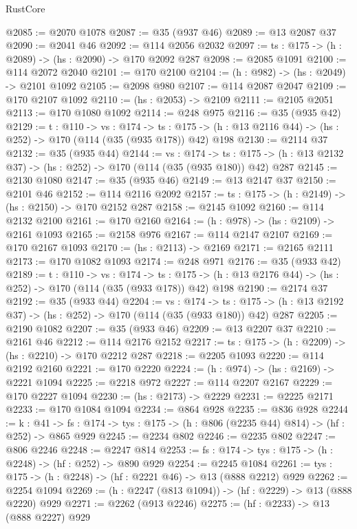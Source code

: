 \begin{lexlean}{RustCore}
\begin{coremodule}
@2085 := @2070 @1078
@2087 := @35 (@937 @46)
@2089 := @13 @2087 @37
@2090 := @2041 @46
@2092 := @114 @2056 @2032
@2097 := {ts : @175} -> (h : @2089) -> (hs : @2090) -> @170 @2092 @287
@2098 := @2085 @1091
@2100 := @114 @2072 @2040
@2101 := @170 @2100
@2104 := (h : @982) -> (hs : @2049) -> @2101 @1092
@2105 := @2098 @980
@2107 := @114 @2087 @2047
@2109 := @170 @2107 @1092
@2110 := (hs : @2053) -> @2109
@2111 := @2105 @2051
@2113 := @170 @1080 @1092
@2114 := @248 @975
@2116 := @35 (@935 @42)
@2129 := {t : @110} ->
  {vs : @174} ->
  {ts : @175} -> (h : @13 @2116 @44) -> (hs : @252) -> @170 (@114 (@35 (@935 @178)) @42) @198
@2130 := @2114 @37
@2132 := @35 (@935 @44)
@2144 := {vs : @174} ->
  {ts : @175} -> (h : @13 @2132 @37) -> (hs : @252) -> @170 (@114 (@35 (@935 @180)) @42) @287
@2145 := @2130 @1080
@2147 := @35 (@935 @46)
@2149 := @13 @2147 @37
@2150 := @2101 @46
@2152 := @114 @2116 @2092
@2157 := {ts : @175} -> (h : @2149) -> (hs : @2150) -> @170 @2152 @287
@2158 := @2145 @1092
@2160 := @114 @2132 @2100
@2161 := @170 @2160
@2164 := (h : @978) -> (hs : @2109) -> @2161 @1093
@2165 := @2158 @976
@2167 := @114 @2147 @2107
@2169 := @170 @2167 @1093
@2170 := (hs : @2113) -> @2169
@2171 := @2165 @2111
@2173 := @170 @1082 @1093
@2174 := @248 @971
@2176 := @35 (@933 @42)
@2189 := {t : @110} ->
  {vs : @174} ->
  {ts : @175} -> (h : @13 @2176 @44) -> (hs : @252) -> @170 (@114 (@35 (@933 @178)) @42) @198
@2190 := @2174 @37
@2192 := @35 (@933 @44)
@2204 := {vs : @174} ->
  {ts : @175} -> (h : @13 @2192 @37) -> (hs : @252) -> @170 (@114 (@35 (@933 @180)) @42) @287
@2205 := @2190 @1082
@2207 := @35 (@933 @46)
@2209 := @13 @2207 @37
@2210 := @2161 @46
@2212 := @114 @2176 @2152
@2217 := {ts : @175} -> (h : @2209) -> (hs : @2210) -> @170 @2212 @287
@2218 := @2205 @1093
@2220 := @114 @2192 @2160
@2221 := @170 @2220
@2224 := (h : @974) -> (hs : @2169) -> @2221 @1094
@2225 := @2218 @972
@2227 := @114 @2207 @2167
@2229 := @170 @2227 @1094
@2230 := (hs : @2173) -> @2229
@2231 := @2225 @2171
@2233 := @170 @1084 @1094
@2234 := @864 @928
@2235 := @836 @928
@2244 := {k : @41} ->
  {fs : @174} -> {tys : @175} -> (h : @806 (@2235 @44) @814) -> (hf : @252) -> @865 @929
@2245 := @2234 @802
@2246 := @2235 @802
@2247 := @806 @2246
@2248 := @2247 @814
@2253 := {fs : @174} -> {tys : @175} -> (h : @2248) -> (hf : @252) -> @890 @929
@2254 := @2245 @1084
@2261 := {tys : @175} -> (h : @2248) -> (hf : @2221 @46) -> @13 (@888 @2212) @929
@2262 := @2254 @1094
@2269 := (h : @2247 (@813 @1094)) -> (hf : @2229) -> @13 (@888 @2220) @929
@2271 := @2262 (@913 @2246)
@2275 := (hf : @2233) -> @13 (@888 @2227) @929

\end{coremodule}
\end{lexlean}
